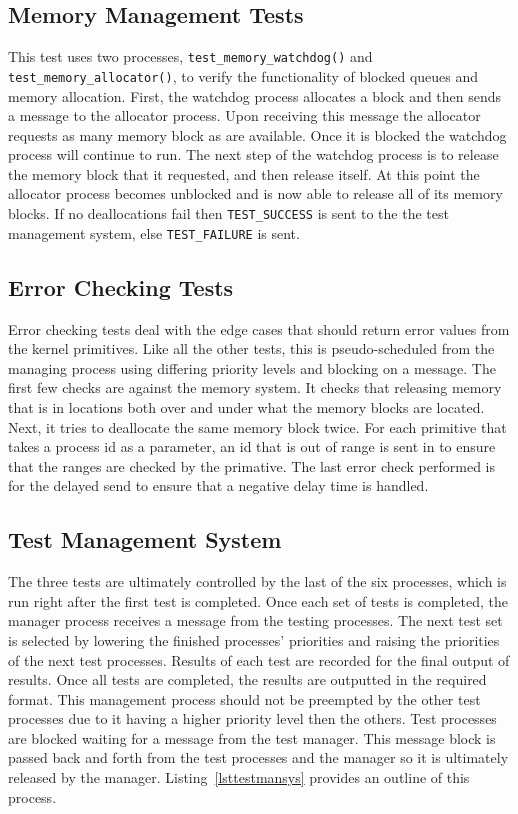 \documentclass[oneside]{article}
\begin{document}
\subsection*{Memory Management Tests}
This test uses two processes, \texttt{test\_memory\_watchdog()} and 
\texttt{test\_memory\_allocator()}, to verify the functionality of blocked 
queues and memory allocation. First, the watchdog process allocates a block and 
then sends a message to the allocator process. Upon receiving this message the 
allocator requests as many memory block as are available. Once it is blocked the 
watchdog process will continue to run. The next step of the watchdog process is 
to release the memory block that it requested, and then release itself. At this 
point the allocator process becomes unblocked and is now able to release all of 
its memory blocks. If no deallocations fail then \texttt{TEST\_SUCCESS} is sent 
to the the test management system, else \texttt{TEST\_FAILURE} is sent.

\subsection*{Error Checking Tests}
Error checking tests deal with the edge cases that should return error values
from the kernel primitives. Like all the other tests, this is pseudo-scheduled
from the managing process using differing priority levels and blocking on a
message. The first few checks are against the memory system. It checks that
releasing memory that is in locations both over and under what the memory
blocks are located. Next, it tries to deallocate the same memory block twice.
For each primitive that takes a process id as a parameter, an id that is out
of range is sent in to ensure that the ranges are checked by the primative. The
last error check performed is for the delayed send to ensure that a negative
delay time is handled.

\subsection*{Test Management System}
The three tests are ultimately controlled by the last of the six processes,
which is run right after the first test is completed. Once each set of tests is
completed, the manager process receives a message from the testing processes.
The next test set is selected by lowering the finished processes' priorities and
raising the priorities of the next test processes. Results of each test are
recorded for the final output of results. Once all tests are completed, the
results are outputted in the required format. This management process should
not be preempted by the other test processes due to it having a higher priority
level then the others. Test processes are blocked waiting for a message from
the test manager. This message block is passed back and forth from the test
processes and the manager so it is ultimately released by the manager.
Listing~\ref{lsttestmansys} provides an outline of this process.
\end{document}
